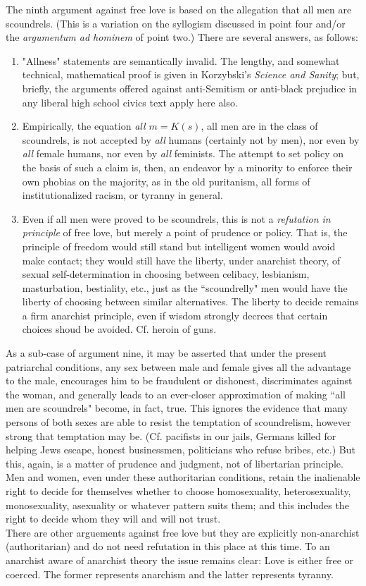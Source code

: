 The ninth argument against free love is based on the allegation that all men are scoundrels. (This is a variation on the syllogism discussed in point four and/or the \emph{argumentum ad hominem} of point two.) There are several answers, as follows:
\begin{enumerate}
\item "Allness" statements are semantically invalid. The lengthy, and somewhat technical, mathematical proof is given in Korzybski's \emph{Science and Sanity}; but, briefly, the arguments offered against anti-Semitism or anti-black prejudice in any liberal high school civics text apply here also.
\item Empirically, the equation \emph{all $m = K(s)$}, all men are in the class of scoundrels, is not accepted by \emph{all} humans (certainly not by men), nor even by \emph{all} female humans, nor even by \emph{all} feminists. The attempt to set policy on the basis of such a claim is, then, an endeavor by a minority to enforce their own phobias on the majority, as in the old puritanism, all forms of institutionalized racism, or tyranny in general.
\item Even if all men were proved to be scoundrels, this is not a \emph{refutation in principle} of free love, but merely a point of prudence or policy. That is, the principle of freedom would still stand but intelligent women would avoid make contact; they would still have the liberty, under anarchist theory, of sexual self-determination in choosing between celibacy, lesbianism, masturbation, bestiality, etc., just as the ``scoundrelly" men would have the liberty of choosing between similar alternatives. The liberty to decide remains a firm anarchist principle, even if wisdom strongly decrees that certain choices shoud be avoided. Cf. heroin of guns.
\end{enumerate}
As a sub-case of argument nine, it may be asserted that under the present patriarchal conditions, any sex between male and female gives all the advantage to the male, encourages him to be fraudulent or dishonest, discriminates against the woman, and generally leads to an ever-closer approximation of making ``all men are scoundrels" become, in fact, true. This ignores the evidence that many persons of both sexes are able to resist the temptation of scoundrelism, however strong that temptation may be. (Cf. pacifists in our jails, Germans killed for helping Jews escape, honest businessmen, politicians who refuse bribes, etc.) But this, again, is a matter of prudence and judgment, not of libertarian principle. Men and women, even under these authoritarian conditions, retain the inalienable right to decide for themselves whether to choose homosexuality, heterosexuality, monosexuality, asexuality or whatever pattern suits them; and this includes the right to decide whom they will and will not trust.\\
There are other arguements against free love but they are explicitly non-anarchist (authoritarian) and do not need refutation in this place at this time. To an anarchist aware of anarchist theory the issue remains clear: Love is either free or coerced. The former represents anarchism and the latter represents tyranny.
